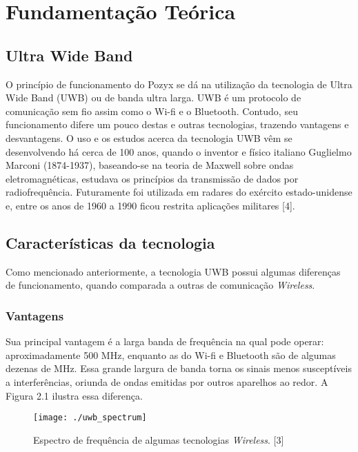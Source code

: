 \chapter{Fundamentação Teórica}
\label{chap:fundteor}



\section{Ultra Wide Band}
\label{sec:sota}
O princípio de funcionamento do Pozyx se dá na utilização da tecnologia 
de Ultra Wide Band (UWB) ou de banda ultra larga. UWB é um protocolo de comunicação sem fio
assim como o Wi-fi e o Bluetooth. Contudo, seu funcionamento difere um pouco destas e outras tecnologias,
trazendo vantagens e desvantagens. O uso e os estudos acerca da tecnologia UWB vêm se desenvolvendo
há cerca de 100 anos, quando o inventor e físico italiano Guglielmo Marconi (1874-1937), baseando-se na teoria 
de Maxwell sobre ondas eletromagnéticas, estudava os princípios da transmissão de dados por radiofrequência. Futuramente 
foi utilizada em radares do exército estado-unidense e, entre os anos de 1960 a 1990 ficou restrita aplicações militares [4].

\section{Características da tecnologia}
\label{sec:ass1}
Como mencionado anteriormente, a tecnologia UWB possui algumas diferenças de funcionamento,
quando comparada a outras de comunicação \textit{Wireless}. 

\subsection{Vantagens}
Sua principal vantagem é a larga banda de frequência na qual pode operar: aproximadamente 500 MHz, 
enquanto as do Wi-fi e Bluetooth são de algumas dezenas de MHz. Essa grande largura de banda torna 
os sinais menos susceptíveis a interferências, oriunda de ondas emitidas por outros aparelhos ao redor.
A Figura 2.1 ilustra essa diferença.

\begin{figure} [h!]												 
	\centering													 
	\texttt{[image: ./uwb\_spectrum]}				 
	\caption{Espectro de frequência de algumas tecnologias \textit{Wireless}. [3]}		
	\label{img:ihuma}												 
\end{figure}

